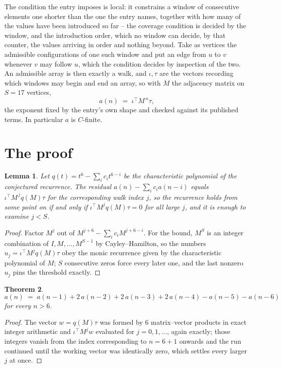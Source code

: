 \documentclass[11pt,a4paper]{article}
\theoremstyle{plain}
\newtheorem{theorem}{Theorem}
\newtheorem{lemma}[theorem]{Lemma}
\theoremstyle{definition}
\begin{document}
The condition the entry imposes is local: it constrains a window of consecutive elements one shorter than the one the entry names, together with how many of the values have been introduced so far -- the coverage condition is decided by the window, and the introduction order, which no window can decide, by that counter, the values arriving in order and nothing beyond. Take as vertices the admissible configurations of one such window and put an edge from $u$ to $v$ whenever $v$ may follow $u$, which the condition decides by inspection of the two.
An admissible array is then exactly a walk, and $\iota,\tau$ are the vectors recording which windows may begin and end an array, so with $M$ the adjacency matrix on $S=17$ vertices,
\[
a(n)\;=\;\iota^{\!\top}M^{\,n}\tau ,
\]
the exponent fixed by the entry's own shape and checked against its published terms. In
particular $a$ is $C$-finite.

\section{The proof}

\begin{lemma}\label{lem:crit}
Let $q(t)=t^{6}-\sum_i c_it^{6-i}$ be the characteristic polynomial of the
conjectured recurrence. The residual $a(n)-\sum_ic_ia(n-i)$ equals
$\iota^{\!\top}M^{\,j}q(M)\tau$ for the corresponding walk index $j$, so the recurrence
holds from some point on if and only if $\iota^{\!\top}M^{j}q(M)\tau=0$ for all large $j$,
and it is enough to examine $j<S$.
\end{lemma}

\begin{proof}
Factor $M^{j}$ out of $M^{j+6}-\sum_ic_iM^{j+6-i}$. For the bound, $M^{S}$
is an integer combination of $I,M,\dots,M^{S-1}$ by Cayley--Hamilton, so the numbers
$u_j=\iota^{\!\top}M^{j}q(M)\tau$ obey the monic recurrence given by the characteristic
polynomial of $M$; $S$ consecutive zeros force every later one, and the last nonzero $u_j$
pins the threshold exactly.
\end{proof}

\begin{theorem}
\[
a(n)\;=\;a(n-1) + 2\,a(n-2) + 2\,a(n-3) + 2\,a(n-4) - a(n-5) - a(n-6)
\]
for every $n>6$.
\end{theorem}

\begin{proof}
The vector $w=q(M)\tau$ was formed by $6$ matrix--vector products in exact integer
arithmetic and $\iota^{\!\top}M^{j}w$ evaluated for $j=0,1,\dots$, again exactly; those
integers vanish from the index corresponding to $n=6+1$ onwards and the run continued
until the working vector was identically zero, which settles every larger $j$ at once.
\end{proof}
\end{document}
